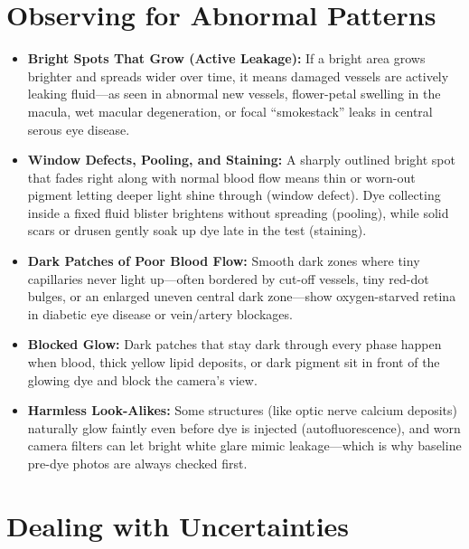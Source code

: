 \section{Observing for Abnormal Patterns}

\begin{itemize}
    \item \textbf{Bright Spots That Grow (Active Leakage):} If a bright area grows brighter and spreads wider over time, it means damaged vessels are actively leaking fluid---as seen in abnormal new vessels, flower-petal swelling in the macula, wet macular degeneration, or focal ``smokestack'' leaks in central serous eye disease.
    \item \textbf{Window Defects, Pooling, and Staining:} A sharply outlined bright spot that fades right along with normal blood flow means thin or worn-out pigment letting deeper light shine through (window defect). Dye collecting inside a fixed fluid blister brightens without spreading (pooling), while solid scars or drusen gently soak up dye late in the test (staining).
    \item \textbf{Dark Patches of Poor Blood Flow:} Smooth dark zones where tiny capillaries never light up---often bordered by cut-off vessels, tiny red-dot bulges, or an enlarged uneven central dark zone---show oxygen-starved retina in diabetic eye disease or vein/artery blockages.
    \item \textbf{Blocked Glow:} Dark patches that stay dark through every phase happen when blood, thick yellow lipid deposits, or dark pigment sit in front of the glowing dye and block the camera's view.
    \item \textbf{Harmless Look-Alikes:} Some structures (like optic nerve calcium deposits) naturally glow faintly even before dye is injected (autofluorescence), and worn camera filters can let bright white glare mimic leakage---which is why baseline pre-dye photos are always checked first.
\end{itemize}

\section{Dealing with Uncertainties}

